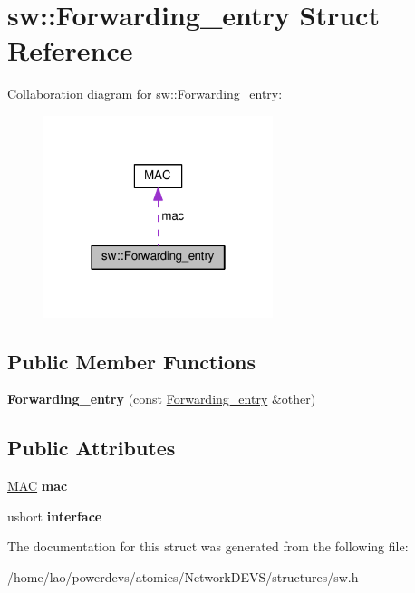\hypertarget{structsw_1_1Forwarding__entry}{}\section{sw\+:\+:Forwarding\+\_\+entry Struct Reference}
\label{structsw_1_1Forwarding__entry}


Collaboration diagram for sw\+:\+:Forwarding\+\_\+entry\+:\nopagebreak
\begin{figure}[H]
\begin{center}
\leavevmode
\includegraphics[width=190pt]{structsw_1_1Forwarding__entry__coll__graph}
\end{center}
\end{figure}
\subsection*{Public Member Functions}
\begin{DoxyCompactItemize}
\item 
{\bfseries Forwarding\+\_\+entry} (const \hyperlink{structsw_1_1Forwarding__entry}{Forwarding\+\_\+entry} \&other)\hypertarget{structsw_1_1Forwarding__entry_a504b52199970b085a23a28cd45b9b788}{}\label{structsw_1_1Forwarding__entry_a504b52199970b085a23a28cd45b9b788}

\end{DoxyCompactItemize}
\subsection*{Public Attributes}
\begin{DoxyCompactItemize}
\item 
\hyperlink{structMAC}{M\+AC} {\bfseries mac}\hypertarget{structsw_1_1Forwarding__entry_a69db303ecdfc75db66ea09b459ace6fc}{}\label{structsw_1_1Forwarding__entry_a69db303ecdfc75db66ea09b459ace6fc}

\item 
ushort {\bfseries interface}\hypertarget{structsw_1_1Forwarding__entry_ab08b8f0d50af0a13308f5fc5224586d6}{}\label{structsw_1_1Forwarding__entry_ab08b8f0d50af0a13308f5fc5224586d6}

\end{DoxyCompactItemize}


The documentation for this struct was generated from the following file\+:\begin{DoxyCompactItemize}
\item 
/home/lao/powerdevs/atomics/\+Network\+D\+E\+V\+S/structures/sw.\+h\end{DoxyCompactItemize}

